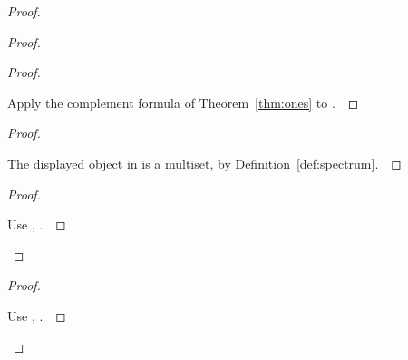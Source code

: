 \documentclass[11pt]{amsart}
\let\qed\relax
\theoremstyle{definition}
\begin{document}
\begin{proof}
\begin{proof}
\begin{proof}
\pf\ \raggedright Apply the complement formula of Theorem~\ref{thm:ones} to .~\qed
\end{proof}
\begin{proof}
\pf\ \raggedright The displayed object in  is a multiset, by Definition~\ref{def:spectrum}.~\qed
\end{proof}
\qedstep
\begin{proof}
\pf\ \raggedright Use , .~\qed
\end{proof}
\end{proof}
\qedstep
\begin{proof}
\pf\ \raggedright Use , .~\qed
\end{proof}
\end{proof}
\end{document}
